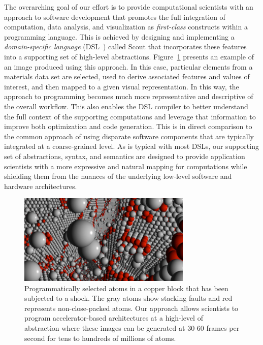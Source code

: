 \documentclass{tcvg}
\begin{document}
   The overarching goal of our effort is to provide computational
   scientists with an approach to software development that promotes
   the full integration of computation, data analysis, and
   visualization as \emph{first-class} constructs within a programming
   language.  This is achieved by designing and implementing a
   \emph{domain-specific language} (DSL~\cite{Fowler:DSL:2010}) called
   Scout that incorporates these features into a supporting
   set of high-level abstractions.  Figure~\ref{fig:spasm} presents an
   example of an image produced using this approach. In this case,  
   particular elements from a materials data set are selected, used to derive associated
   features and values of interest, and then mapped to a given visual
   representation.  In this way, the approach to programming becomes
   much more representative and descriptive of the overall workflow.
   This also enables the DSL compiler to better understand the full
   context of the supporting computations and leverage that information
   to improve both optimization and code generation.  This is in direct 
   comparison to the common approach of using disparate software components 
   that are typically integrated at a coarse-grained level.  As is typical with 
   most DSLs, our supporting set of abstractions, syntax, and semantics 
   are designed to provide application scientists with a more expressive 
   and natural mapping for computations while shielding them from the nuances
   of the underlying low-level software and hardware architectures.

 	\begin{figure}[b!]
	  \centering
	  \includegraphics[width=3.25in]{figures/spasm.png}
	  \caption{Programmatically selected atoms in a copper block
         that has been subjected to a shock.  The gray atoms 
         show stacking faults and red represents non-close-packed 
         atoms.  Our approach allows scientists to program accelerator-based
         architectures at a high-level of abstraction where these images can 
         be generated at 30-60 frames per second for tens to hundreds of 
         millions of atoms.}
	  \label{fig:spasm}
	\end{figure}
\end{document}
